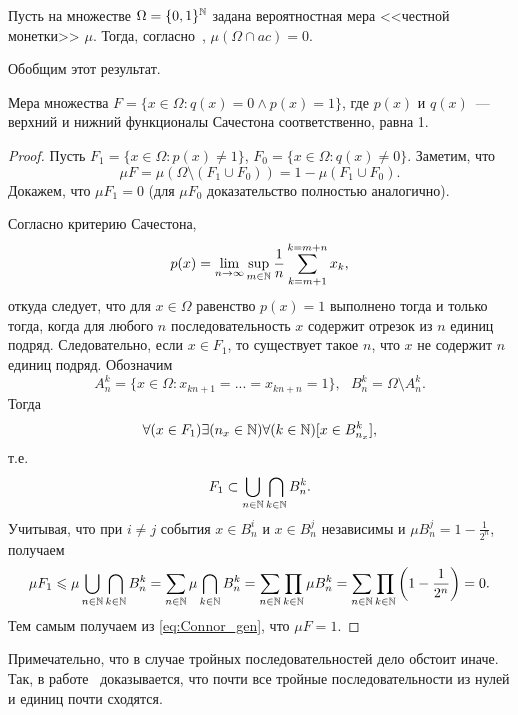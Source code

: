 Пусть на множестве $\Omega=\{0,1\}^{\mathbb{N}}$ задана вероятностная мера <<честной монетки>> $\mu$.
Тогда, согласно~\cite{connor1990almost}, $\mu(\Omega\cap ac)=0$.

Обобщим этот результат.
\begin{theorem}
	Мера множества $F=\{x\in\Omega : q(x) = 0 \wedge p(x)= 1\}$,
	где $p(x)$ и $q(x)$~--- верхний и нижний функционалы Сачестона соответственно,
	равна 1.
\end{theorem}

\begin{proof}
	Пусть $F_1=\{x\in\Omega : p(x) \neq 1\}$, $F_0=\{x\in\Omega : q(x) \neq 0\}$.
	Заметим, что
	\begin{equation}
		\label{eq:Connor_gen}
		\mu F = \mu (\Omega\setminus(F_1 \cup F_0)) = 1 - \mu (F_1 \cup F_0)
		.
	\end{equation}
	Докажем, что $\mu F_1 = 0 $	(для $\mu F_0$  доказательство полностью аналогично).

	Согласно критерию Сачестона,
	\begin{equation}
		p(x) = \lim_{n\to\infty} \sup_{m\in\mathbb{N}} \frac{1}{n} \sum_{k=m+1}^{k=m+n} x_k
		,
	\end{equation}
	откуда следует, что
	для $x\in\Omega$ равенство $p(x) = 1$ выполнено тогда и только тогда,
	когда для любого $n$ последовательность $x$ содержит отрезок из $n$ единиц подряд.
%
	Следовательно, если $x\in F_1$,
	то существует такое $n$,
	что $x$ не содержит $n$ единиц подряд.
%
%
	Обозначим
	\begin{equation}
		A_n^k = \{x\in\Omega : x_{kn+1} = ... = x_{kn+n} = 1\}
		,
		~~~
		B_n^k = \Omega \setminus A_n^k
		.
	\end{equation}
	Тогда
	\begin{equation}
		\forall(x\in F_1)\exists(n_x\in\mathbb{N})\forall(k\in\mathbb{N})[x\in B_{n_x}^k]
		,
	\end{equation}
	т.е.
	\begin{equation}
		F_1 \subset \bigcup_{n\in\mathbb{N}} \bigcap_{k\in\mathbb{N}} B_{n}^k
		.
	\end{equation}
	Учитывая, что при $i\neq j$ события $x\in B_n^i$ и $x\in B_n^j$ независимы и $\mu B_n^j = 1-\frac{1}{2^n}$,
	получаем
	\begin{multline}
		\mu F_1 \leqslant \mu \bigcup_{n\in\mathbb{N}} \bigcap_{k\in\mathbb{N}} B_{n}^k
		=
		\sum_{n\in\mathbb{N}} \mu \bigcap_{k\in\mathbb{N}} B_{n}^k
		=
		\sum_{n\in\mathbb{N}}  \prod_{k\in\mathbb{N}} \mu B_{n}^k
		=
		\sum_{n\in\mathbb{N}}  \prod_{k\in\mathbb{N}} \left( 1-\frac{1}{2^n} \right)
		=0
		.
	\end{multline}
	Тем самым получаем из \eqref{eq:Connor_gen}, что $\mu F = 1$.
\end{proof}

\begin{remark}
	Примечательно, что в случае тройных последовательностей дело обстоит иначе.
	Так, в работе~\cite{esi2014almost} доказывается, что почти все тройные последовательности из нулей и единиц почти сходятся.
\end{remark}

